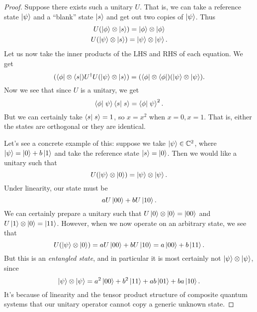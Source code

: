 \begin{proof}
    Suppose there exists such a unitary $U$. That is, we can take a reference state $\left| \psi \right>$ and a ``blank'' state $\left| s \right>$ and get out two copies of $\left| \psi \right>$. Thus
    \begin{gather}
        U(\left| \phi \right>\otimes \left| s \right>)=\left| \phi \right> \otimes \left| \phi \right>\\
        U(\left| \psi \right>\otimes \left| s \right>)= \left| \psi \right>\otimes \left| \psi \right>.
    \end{gather}
    Let us now take the inner products of the LHS and RHS of each equation. We get
    \begin{equation}
        (\left< \phi \right|\otimes \left< s \right|)U^\dagger U (\left| \psi \right>\otimes \left| s \right>) =(\left< \phi \right| \otimes \left< \phi \right|)(\left| \psi \right>\otimes \left| \psi \right>).
    \end{equation}
    Now we see that since $U$ is a unitary, we get
    \begin{equation}
        \braket{\phi}{\psi}\braket{s}{s}=\braket{\phi}{\psi}^2.
    \end{equation}
    But we can certainly take $\braket{s}{s}=1$, so $x=x^2$ when $x=0,x=1$. That is, either the states are orthogonal or they are identical.
    
    Let's see a concrete example of this: suppose we take $\left| \psi \right>\in \mathbb{C}^2$, where $\left| \psi \right>= \left| 0 \right> + b\left| 1 \right>$ and take the reference state $\left| s \right>=\left| 0 \right>$. Then we would like a unitary such that
    \begin{equation}
        U(\left| \psi \right>\otimes \left| 0 \right>)=\left| \psi \right>\otimes \left| \psi \right>.
    \end{equation}
    Under linearity, our state must be
    \begin{equation}
        a U\left| 00 \right>+b U\left| 10 \right>.
    \end{equation}
    We can certainly prepare a unitary such that $U\left| 0 \right>\otimes \left| 0 \right>=\left| 00 \right>$ and $U\left| 1 \right>\otimes \left| 0 \right>=\left| 11 \right>$. However, when we now operate on an arbitrary state, we see that
    \begin{equation}
        U(\left| \psi \right>\otimes \left| 0 \right>)=aU \left| 00 \right>+b U\left| 10 \right> = a\left| 00 \right> +b\left| 11 \right>.
    \end{equation}
    But this is an \emph{entangled state}, and in particular it is most certainly not $\left| \psi \right>\otimes \left| \psi \right>$, since
    \begin{equation}
        \left| \psi \right>\otimes \left| \psi \right> =a^2 \left| 00 \right> + b^2 \left| 11 \right> + ab\left| 01 \right> +ba \left| 10 \right>.
    \end{equation}
    It's because of linearity and the tensor product structure of composite quantum systems that our unitary operator cannot copy a generic unknown state.
\end{proof}


